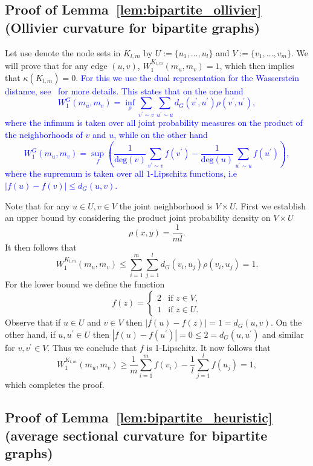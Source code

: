 \documentclass{article} %
\newcommand{\ph}[1]{\textcolor{blue}{#1}}
\begin{document}
\subsection{Proof of Lemma~\ref{lem:bipartite_ollivier} (Ollivier curvature for bipartite graphs)}\label{app:bipartite_ollivier}

Let use denote the node sets in $K_{l,m}$ by $U := \{u_1, \dots, u_l\}$ and $V := \{v_1, \dots, v_m\}$. We will prove that for any edge $(u, v)$, $W_1^{K_{l,m}}(m_{u},m_{v}) = 1$, which then implies that $\kappa(K_{l,m}) = 0$. \ph{For this we use the dual representation for the Wasserstein distance, see~\cite{ollivier2009ricci} for more details. This states that on the one hand
\[
	W^{G}_1(m_u,m_v) = \inf_{\rho} \sum_{v^\prime \sim v} \sum_{u^\prime \sim u} d_G(v^\prime, u^\prime) \rho(v^\prime, u^\prime),
\]
where the infimum is taken over all joint probability measures on the product of the neighborhoods of $v$ and $u$, while on the other hand
\[
	W^{G}_1(m_u,m_v) = \sup_{f} \left( \frac{1}{\mathrm{deg}(v) }\sum_{v^\prime \sim v} f(v^\prime) - \frac{1}{\mathrm{deg}(u) }\sum_{u^\prime \sim u} f(u^\prime)\right),
\]
where the supremum is taken over all $1$-Lipschitz functions, i.e $|f(u) - f(v)| \le d_G(u,v)$.}

Note that for any $u \in U, v \in V$ the joint neighborhood is $V \times U$. First we establish an upper bound by considering the product joint probability density on $V \times U$
\[
	\rho(x,y) =	\frac{1}{m l}.
\]
It then follows that
\[
	W_1^{K_{l,m}}(m_{u},m_{v}) \le \sum_{i = 1}^m \sum_{j = 1}^l d_G(v_i, u_j) \rho(v_i, u_j)
	= 1.
\]
For the lower bound we define the function
\[
	f(z) = \begin{cases}
		2 &\mbox{if } z \in V,\\
		1 &\mbox{if } z \in U.
	\end{cases}
\]
Observe that if $u \in U$ and $v \in V$ then $|f(u) - f(z)| = 1 = d_G(u,v)$. On the other hand, if $u, u^\prime \in U$ then $|f(u) - f(u^\prime)| = 0 \le 2 = d_G(u,u^\prime)$ and similar for $v, v^\prime \in V$. Thus we conclude that $f$ is 1-Lipschitz. It now follows that
\[
	W_1^{K_{l,m}}(m_u,m_v) \ge \frac{1}{m} \sum_{i = 1}^m f(v_i) - \frac{1}{l} \sum_{j = 1}^l f(u_j) = 1,
\]
which completes the proof.

\subsection{Proof of Lemma~\ref{lem:bipartite_heuristic} (average sectional curvature for bipartite graphs)}\label{app:bipartite_heuristic}
\end{document}
